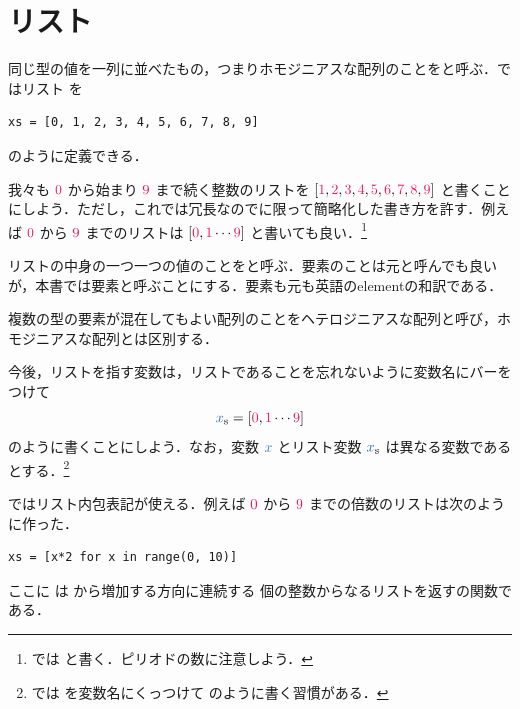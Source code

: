\documentclass[a5paper,twoside,fleqn,draft]{jsbook}
\begin{document}
\section{リスト}

同じ型の値を一列に並べたもの，つまりホモジニアスな配列のことをと呼ぶ．\python ではリスト  を
\begin{pythoncode}
\begin{verbatim}
xs = [0, 1, 2, 3, 4, 5, 6, 7, 8, 9]
\end{verbatim}
\end{pythoncode}
のように定義できる．

我々も $\hConstant{0}$ から始まり $\hConstant{9}$ まで続く整数のリストを $[\hConstant{1},\hConstant{2},\hConstant{3},\hConstant{4},\hConstant{5},\hConstant{6},\hConstant{7},\hConstant{8},\hConstant{9}]$ と書くことにしよう．ただし，これでは冗長なのでに限って簡略化した書き方を許す．例えば $\hConstant{0}$ から $\hConstant{9}$ までのリストは $[\hConstant{0},\hConstant{1}\dotsb\hConstant{9}]$ と書いても良い．\footnote{\haskell では \code{[0, 1..9]} と書く．ピリオドの数に注意しよう．}

リストの中身の一つ一つの値のことをと呼ぶ．要素のことは元と呼んでも良いが，本書では要素と呼ぶことにする．要素も元も英語のelementの和訳である．

複数の型の要素が混在してもよい配列のことをヘテロジニアスな配列と呼び，ホモジニアスな配列とは区別する．

今後，リストを指す変数は，リストであることを忘れないように変数名にバーをつけて
\begin{equation}
  \hListVar{x}
  =\hListWith{\hConstant{0},\hConstant{1}\dotsb\hConstant{9}}
\end{equation}
のように書くことにしよう．なお，変数 $\hVar{x}$ とリスト変数 $\hListVar{x}$ は異なる変数であるとする．\footnote{\haskell では  を変数名にくっつけて  のように書く習慣がある．}

\separator

\python ではリスト内包表記が使える．例えば $\hConstant{0}$ から $\hConstant{9}$ までの倍数のリストは次のように作った．
\begin{pythoncode}
\begin{verbatim}
xs = [x*2 for x in range(0, 10)]
\end{verbatim}
\end{pythoncode}
ここに  は  から増加する方向に連続する  個の整数からなるリストを返す\python の関数である．
\end{document}
